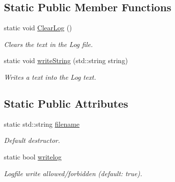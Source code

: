 \subsection*{Static Public Member Functions}
\begin{DoxyCompactItemize}
\item 
\hypertarget{class_f2_c_1_1_log_error_a37fe6ce832fff15978a84a923b081b1b}{
static void \hyperlink{class_f2_c_1_1_log_error_a37fe6ce832fff15978a84a923b081b1b}{ClearLog} ()}
\label{class_f2_c_1_1_log_error_a37fe6ce832fff15978a84a923b081b1b}

\begin{DoxyCompactList}\small\item\em Clears the text in the Log file. \item\end{DoxyCompactList}\item 
static void \hyperlink{class_f2_c_1_1_log_error_a7821ec372e85a3d2c7095c4902525908}{writeString} (std::string string)
\begin{DoxyCompactList}\small\item\em Writes a text into the Log text. \item\end{DoxyCompactList}\end{DoxyCompactItemize}
\subsection*{Static Public Attributes}
\begin{DoxyCompactItemize}
\item 
static std::string \hyperlink{class_f2_c_1_1_log_error_aa5dc474b29884812c02be68e1c45c56e}{filename}
\begin{DoxyCompactList}\small\item\em Default destructor. \item\end{DoxyCompactList}\item 
\hypertarget{class_f2_c_1_1_log_error_a40a853a8ce671575d7b57433b14d2789}{
static bool \hyperlink{class_f2_c_1_1_log_error_a40a853a8ce671575d7b57433b14d2789}{writelog}}
\label{class_f2_c_1_1_log_error_a40a853a8ce671575d7b57433b14d2789}

\begin{DoxyCompactList}\small\item\em Logfile write allowed/forbidden (default: true). \item\end{DoxyCompactList}\end{DoxyCompactItemize}


